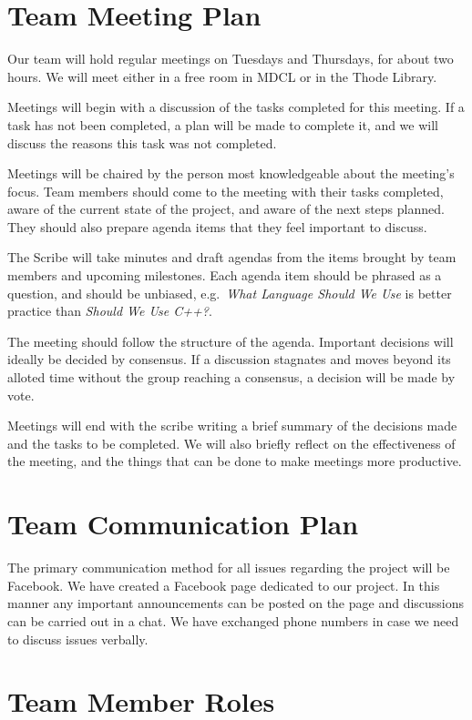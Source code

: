 \documentclass{article}
\begin{document}
\section{Team Meeting Plan} %
Our team will hold regular meetings on Tuesdays and Thursdays, for about two hours. We will meet either in a free room in MDCL or in the Thode Library.

Meetings will begin with a discussion of the tasks completed for this meeting. If a task has not been completed, a plan will be made to complete it, and we will discuss the reasons this task was not completed.

  Meetings will be chaired by the person most knowledgeable about the meeting's focus. Team members should come to the meeting with their tasks completed, aware of the current state of the project, and aware of the next steps planned. They should also prepare agenda items that they feel important to discuss. 

  The Scribe will take minutes and draft agendas from the items brought by team members and upcoming milestones. Each agenda item should be phrased as a question, and should be unbiased, e.g.\ \textit{What Language Should We Use} is better practice than \textit{Should We Use C++?}.

  The meeting should follow the structure of the agenda. Important decisions will ideally be decided by consensus. If a discussion stagnates and moves beyond its alloted time without the group reaching a consensus, a decision will be made by vote.
  
  Meetings will end with the scribe writing a brief summary of the decisions made and the tasks to be completed. We will also briefly reflect on the effectiveness of the meeting, and the things that can be done to make meetings more productive.
\section{Team Communication Plan} %

The primary communication method for all issues regarding the project will be Facebook. We have created a Facebook page dedicated to our project. In this manner any important announcements can be posted on the page and discussions can be carried out in a chat. We have exchanged phone numbers in case we need to discuss issues verbally. 

\section{Team Member Roles} %
\end{document}
